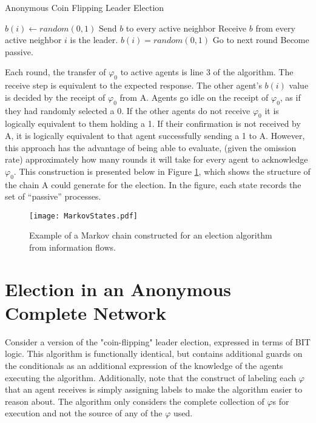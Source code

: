 \begin{algorithm}
\caption{Anonymous Coin Flipping Leader Election}
\label{alg:coinflip2}
\begin{algorithmic}[1]
\small
\State $b(i) \gets random(0,1)$
\State Send $b$ to every active neighbor
\State Receive $b$ from every active neighbor
	\State $i$ is the leader.
		\State $b(i) = random(0,1)$
		\State Go to next round
		\State Become passive.
	\EndIf
\end{algorithmic}
\end{algorithm}

Each round, the transfer of $\varphi_0$ to active agents is line 3 of the algorithm. The receive step is equivalent to the expected response. The other agent's $b(i)$ value is decided by the receipt of $\varphi_0$ from A. Agents go idle on the receipt of $\varphi_0$, as if they had randomly selected a 0. If the other agents do not receive $\varphi_0$ it is logically equivalent to them holding a 1. If their confirmation is not received by A, it is logically equivalent to that agent successfully sending a 1 to A. However, this approach has the advantage of being able to evaluate, (given the omission rate) approximately how many rounds it will take for every agent to acknowledge $\varphi_0$. This construction is presented below in Figure \ref{fig:markovstates}, which shows the structure of the chain A could generate for the election. In the figure, each state records the set of ``passive'' processes.

\begin{figure}
\begin{centering}
\texttt{[image: MarkovStates.pdf]}
\caption{Example of a Markov chain constructed for an election algorithm from information flows.}
\label{fig:markovstates}
\end{centering}
\end{figure}

\section{Election in an Anonymous Complete Network}

Consider a version of the "coin-flipping" leader election, expressed in terms of BIT logic.
This algorithm is functionally identical, but contains additional guards on the conditionals as an additional expression of the knowledge of the agents executing the algorithm.
Additionally, note that the construct of labeling each $\varphi$ that an agent receives is simply assigning labels to make the algorithm easier to reason about.
The algorithm only considers the complete collection of $\varphi$s for execution and not the source of any of the $\varphi$ used.

